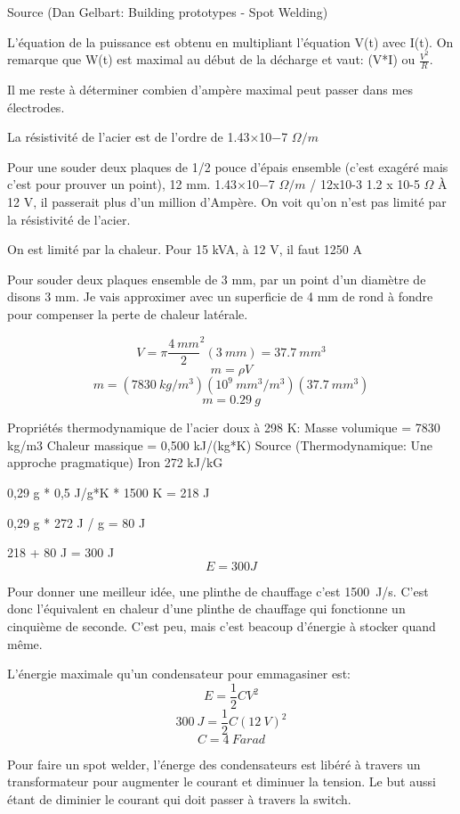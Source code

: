 \documentclass[12 pt, a4paper]{report} %
\begin{document}
Source (Dan Gelbart: Building prototypes - Spot Welding)

L'équation de la puissance est obtenu en multipliant l'équation V(t) avec I(t). On remarque que W(t) est maximal au début de la décharge et vaut: (V*I) ou $\frac{V^2}{R}$.

Il me reste à déterminer combien d'ampère maximal peut passer dans mes électrodes.

La résistivité de l'acier est de l'ordre de 1.43×10−7 $\Omega / m$

Pour une souder deux plaques de 1/2 pouce d'épais ensemble (c'est exagéré mais c'est pour prouver un point), 12 mm.
1.43×10−7 $\Omega / m$ / 12x10-3
1.2 x 10-5 $\Omega$
À 12 V, il passerait plus d'un million d'Ampère. On voit qu'on n'est pas limité par la résistivité de l'acier.

On est limité par la chaleur.
Pour 15 kVA, à 12 V, il faut 1250 A

Pour souder deux plaques ensemble de 3 mm, par un point d'un diamètre de disons 3 mm. Je vais approximer avec un superficie de 4 mm de rond à fondre pour compenser la perte de chaleur latérale.

\[V = \pi\frac{\SI{4}{mm}}{2}^{2}(\SI{3}{mm}) = \SI{37,7}{mm^{3}}\]
\[m = \rho V\]
\[m = (\SI{7830}{kg/m^3})(10^{9}\SI{}{mm^3/m^3})(\SI{37,7}{mm^3})\]
\[\boxed{m = \SI{0,29}{g}}\]

Propriétés thermodynamique de l'acier doux à 298 K:
Masse volumique = 7830 kg/m3
Chaleur massique = 0,500 kJ/(kg*K)
Source (Thermodynamique: Une approche pragmatique)
Iron	272 kJ/kG

0,29 g * 0,5 J/g*K * 1500 K = 218 J

0,29 g * 272 J / g = 80 J

218 + 80 J = 300 J
\[\boxed{E = 300 J}\]

Pour donner une meilleur idée, une plinthe de chauffage c'est 1500~J/s. C'est donc l'équivalent en chaleur d'une plinthe de chauffage qui fonctionne un cinquième de seconde. C'est peu, mais c'est beacoup d'énergie à stocker quand même.

L'énergie maximale qu'un condensateur pour emmagasiner est:
\[E = \frac{1}{2}CV^2\]
\[\SI{300}{J} = \frac{1}{2}C(\SI{12}{V})^2\]
\[\boxed{C = \SI{4}{Farad}}\]

Pour faire un spot welder, l'énerge des condensateurs est libéré à travers un transformateur pour augmenter le courant et diminuer la tension. Le but aussi étant de diminier le courant qui doit passer à travers la switch.
\end{document}
